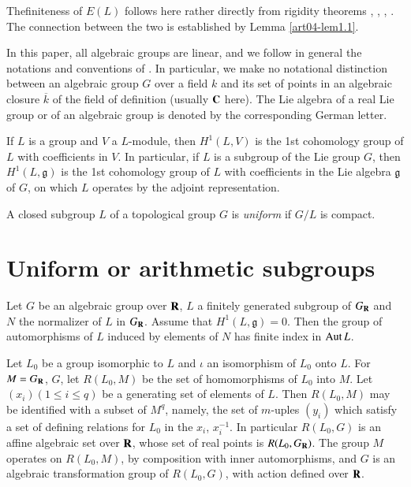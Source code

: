 The\pageoriginale finiteness of $E(L)$ follows here rather directly from rigidity theorems \cite{art04-key25}, \cite{art04-key26}, \cite{art04-key32}, \cite{art04-key33}. The connection between the two is established by Lemma \ref{art04-lem1.1}.

\begin{notation*}
In this paper, all algebraic groups are linear, and we follow in general the notations and conventions of \cite{art04-key9}. In particular, we make no notational distinction between an algebraic group $G$ over a field $k$ and its set of points in an algebraic closure $\overline{k}$ of the field of definition (usually $\mathbf{C}$ here). The Lie algebra of a real Lie group or of an algebraic group is denoted by the corresponding German letter.
\end{notation*}

If $L$ is a group and $V$ a $L$-module, then $H^{1}(L,V)$ is the 1st cohomology group of $L$ with coefficients in $V$. In particular, if $L$ is a subgroup of the Lie group $G$, then $H^{1}(L,\mathfrak{g})$ is the 1st cohomology group of $L$ with coefficients in the Lie algebra $\mathfrak{g}$ of $G$, on which $L$ operates by the adjoint representation.

A closed subgroup $L$ of a topological group $G$ is {\em uniform} if $G/L$ is compact.

\section{Uniform or arithmetic subgroups}\label{art04-sec1}

\begin{lemma}\label{art04-lem1.1}
Let $G$ be an algebraic group over $\mathbf{R}$, $L$ a finitely generated subgroup of $G_{\mathbf{R}}$ and $N$ the normalizer of $L$ in $G_{\mathbf{R}}$. Assume that $H^{1}(L,\mathfrak{g})=0$. Then the group of automorphisms of $L$ induced by elements of $N$ has finite index in $\operatorname{\mathrm{Aut}} L$.
\end{lemma}

Let $L_{0}$ be a group isomorphic to $L$ and $\iota$ an isomorphism of $L_{0}$ onto $L$. For $M=G_{\mathbf{R}}$, $G$, let $R(L_{0},M)$ be the set of homomorphisms of $L_{0}$ into $M$. Let $(x_{i})(1\leq i\leq q)$ be a generating set of elements of $L$. Then $R(L_{0},M)$ may be identified with a subset of $M^{q}$, namely, the set of $m$-uples $(y_{i})$ which satisfy a set of defining relations for $L_{0}$ in the $x_{i}$, $x_{i}^{-1}$. In particular $R(L_{0},G)$ is an affine algebraic set over $\mathbf{R}$, whose set of real points is $R(L_{0},G_{\mathbf{R}})$. The group $M$ operates on $R(L_{0},M)$, by composition with inner automorphisms, and $G$ is an algebraic transformation group of $R(L_{0},G)$, with action defined over $\mathbf{R}$.

